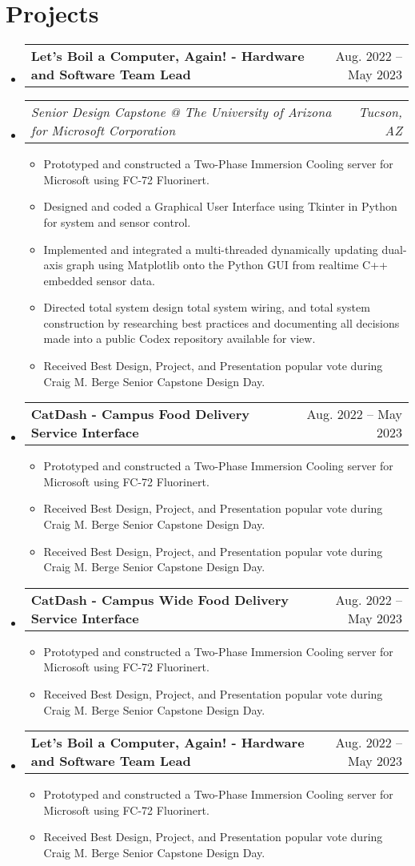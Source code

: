 \documentclass[letterpaper,11pt]{article}
\makeatletter
\newcommand{\resumeItem}[1]{
  \item\small{
    {#1 \vspace{-2pt}}
  }
}
\newcommand{\resumeSubSubheading}[2]{
    \item
    \begin{tabular*}{0.97\textwidth}{l@{\extracolsep{\fill}}r}
      \textit{\small#1} & \textit{\small #2} \\
    \end{tabular*}\vspace{-7pt}
}
\newcommand{\resumeProjectHeading}[2]{
    \item
    \begin{tabular*}{0.97\textwidth}{l@{\extracolsep{\fill}}r}
      \small#1 & #2 \\
    \end{tabular*}\vspace{-7pt}
}
\newcommand{\resumeSubHeadingListStart}{\begin{itemize}[leftmargin=0.15in, label={}]}
\newcommand{\resumeSubHeadingListEnd}{\end{itemize}}
\newcommand{\resumeItemListStart}{\begin{itemize}}
\newcommand{\resumeItemListEnd}{\end{itemize}\vspace{-5pt}}
\makeatother
\begin{document}
\section{Projects}
    \resumeSubHeadingListStart
      \resumeProjectHeading
          {\textbf{Let's Boil a Computer, Again! - Hardware and Software Team Lead} }{Aug. 2022 -- May 2023}
          \resumeSubSubheading{Senior Design Capstone @ The University of Arizona for Microsoft Corporation}{Tucson, AZ}
          \resumeItemListStart
            \resumeItem{Prototyped and constructed a Two-Phase Immersion Cooling server for Microsoft using FC-72 Fluorinert.}
            \resumeItem{Designed and coded a Graphical User Interface using Tkinter in Python for system and sensor control.}
            \resumeItem{Implemented and integrated a multi-threaded dynamically updating dual-axis graph using Matplotlib onto the Python GUI from realtime C++ embedded sensor data.}
            \resumeItem{Directed total system design total system wiring, and total system construction by researching best practices and documenting all decisions made into a public Codex repository available for view.}
            \resumeItem{Received Best Design, Project, and Presentation popular vote during Craig M. Berge Senior Capstone Design Day.}
          \resumeItemListEnd
      \resumeProjectHeading
          {\textbf{CatDash - Campus Food Delivery Service Interface} }{Aug. 2022 -- May 2023}{}
          \resumeItemListStart
            \resumeItem{Prototyped and constructed a Two-Phase Immersion Cooling server for Microsoft using FC-72 Fluorinert.}
            \resumeItem{Received Best Design, Project, and Presentation popular vote during Craig M. Berge Senior Capstone Design Day.}
            \resumeItem{Received Best Design, Project, and Presentation popular vote during Craig M. Berge Senior Capstone Design Day.}
          \resumeItemListEnd
      \resumeProjectHeading
          {\textbf{CatDash - Campus Wide Food Delivery Service Interface} }{Aug. 2022 -- May 2023}{}
          \resumeItemListStart
            \resumeItem{Prototyped and constructed a Two-Phase Immersion Cooling server for Microsoft using FC-72 Fluorinert.}
            \resumeItem{Received Best Design, Project, and Presentation popular vote during Craig M. Berge Senior Capstone Design Day.}
          \resumeItemListEnd
      \resumeProjectHeading
          {\textbf{Let's Boil a Computer, Again! - Hardware and Software Team Lead} }{Aug. 2022 -- May 2023}{}
          \resumeItemListStart
            \resumeItem{Prototyped and constructed a Two-Phase Immersion Cooling server for Microsoft using FC-72 Fluorinert.}
            \resumeItem{Received Best Design, Project, and Presentation popular vote during Craig M. Berge Senior Capstone Design Day.}
          \resumeItemListEnd
    \resumeSubHeadingListEnd
\end{document}
